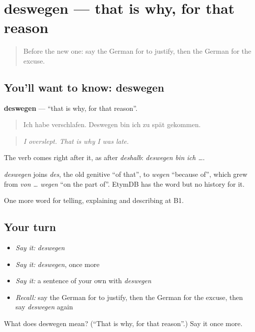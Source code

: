 \section[deswegen]{deswegen — that is why, for that reason}

\label{lesson:GE-C348-deswegen}



\begin{quote}
Before the new one: say the German for to justify, then the German for the excuse.
\end{quote}

\subsection*{You'll want to know: deswegen}
\textbf{deswegen} — \textquotedblleft{}that is why, for that reason\textquotedblright{}.

\begin{quote}
Ich habe verschlafen. Deswegen bin ich zu spät gekommen.
\end{quote}

\begin{quote}
\emph{I overslept. That is why I was late.}
\end{quote}

The verb comes right after it, as after \emph{deshalb}: \emph{deswegen bin ich …}.

\begin{cousinweb}
\emph{deswegen} joins \emph{des}, the old genitive \textquotedblleft{}of that\textquotedblright{}, to \emph{wegen} \textquotedblleft{}because of\textquotedblright{}, which grew from \emph{von … wegen} \textquotedblleft{}on the part of\textquotedblright{}. EtymDB has the word but no history for it.
\end{cousinweb}

\begin{grammarlens}[title={What you've built}]
One more word for telling, explaining and describing at B1.
\end{grammarlens}

\subsection*{Your turn}
\begin{itemize}
\raggedright
  \item \emph{Say it:} \emph{deswegen}
  \item \emph{Say it:} \emph{deswegen}, once more
  \item \emph{Say it:} a sentence of your own with \emph{deswegen}
  \item \emph{Recall:} say the German for to justify, then the German for the excuse, then say \emph{deswegen} again
\end{itemize}

\begin{tcolorbox}[breakable,colback=teal!4,colframe=teal!35!black,title={Before you move on}]
What does deswegen mean? (\textquotedblleft{}That is why, for that reason\textquotedblright{}.) Say it once more.
\end{tcolorbox}
